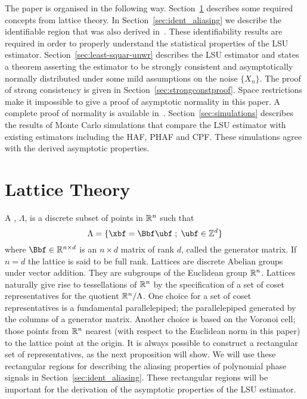 \documentclass[journal]{IEEEtran}
\begin{document}
The paper is organised in the following way. Section~\ref{sec:lattice-theory} describes some required concepts from lattice theory.  In Section~\ref{sec:ident_aliasing} we describe the identifiable region that was also derived in~\cite{McKilliam2009IndentifiabliltyAliasingPolyphase}.  These identifiability results are required in order to properly understand the statistical properties of the LSU estimator.  Section~\ref{sec:least-squar-unwr} describes the LSU estimator and states a theorem asserting the estimator to be strongly consistent and asymptotically normally distributed under some mild assumptions on the noise $\{X_n\}$. The proof of strong consistency is given in Section~\ref{sec:strongconstproof}.  Space restrictions make it impossible to give a proof of asymptotic normality in this paper.  A complete proof of normality is available in~\cite{McKilliam_arxiv_pps_unwrapping_2012}.  Section~\ref{sec:simulations} describes the results of Monte Carlo simulations that compare the LSU estimator with existing estimators including the HAF, PHAF and CPF.  These simulations agree with the derived asymptotic properties.




\section{Lattice Theory}\label{sec:lattice-theory}

A ,  $\Lambda$, is a discrete subset of points in ${\mathbb R}^n$ such that
\[
   \Lambda = \{\xbf = \Bbf\ubf \mid \ubf \in \ints^d \}
\]
where $\Bbf \in \reals^{n \times d}$ is an $n \times d$ matrix of rank $d$, called the generator matrix.  If $n = d$ the lattice is said to be full rank.  Lattices are discrete Abelian groups under vector addition.  They are subgroups of the Euclidean group ${\mathbb R}^n$.  Lattices naturally give rise to tessellations of ${\mathbb R}^n$ by the specification of a set of coset representatives for the quotient ${\mathbb R}^n / \Lambda$.  One choice for a set of coset representatives is a fundamental parallelepiped; the parallelepiped generated by the columns of a generator matrix.  Another choice is based on the Voronoi cell; those points from ${\mathbb R}^n$ nearest (with respect to the Euclidean norm in this paper) to the lattice point at the origin.  It is always possible to construct a rectangular set of representatives, as the next proposition will show.  We will use these rectangular regions for describing the aliasing properties of polynomial phase signals in Section~\ref{sec:ident_aliasing}.  These rectangular regions will be important for the derivation of the asymptotic properties of the LSU estimator.
\end{document}
